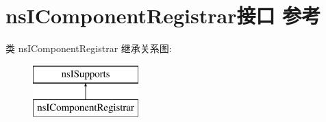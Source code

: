 \hypertarget{interfacens_i_component_registrar}{}\section{ns\+I\+Component\+Registrar接口 参考}
\label{interfacens_i_component_registrar}
类 ns\+I\+Component\+Registrar 继承关系图\+:\begin{figure}[H]
\begin{center}
\leavevmode
\includegraphics[height=2.000000cm]{interfacens_i_component_registrar}
\end{center}
\end{figure}
